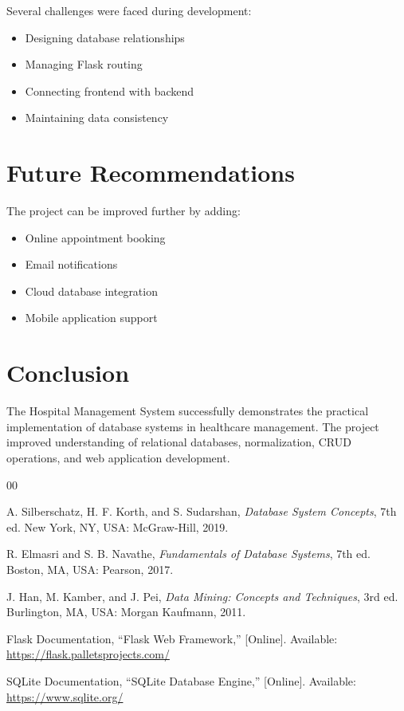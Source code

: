 \documentclass[conference]{IEEEtran}
\begin{document}
Several challenges were faced during development:

\begin{itemize}
    \item Designing database relationships
    \item Managing Flask routing
    \item Connecting frontend with backend
    \item Maintaining data consistency
\end{itemize}

\section{Future Recommendations}

The project can be improved further by adding:

\begin{itemize}
    \item Online appointment booking
    \item Email notifications
    \item Cloud database integration
    \item Mobile application support
\end{itemize}

\section{Conclusion}

The Hospital Management System successfully demonstrates the practical implementation of database systems in healthcare management. The project improved understanding of relational databases, normalization, CRUD operations, and web application development.

\begin{thebibliography}{00}

 A. Silberschatz, H. F. Korth, and S. Sudarshan, \textit{Database System Concepts}, 7th ed. New York, NY, USA: McGraw-Hill, 2019.

 R. Elmasri and S. B. Navathe, \textit{Fundamentals of Database Systems}, 7th ed. Boston, MA, USA: Pearson, 2017.

 J. Han, M. Kamber, and J. Pei, \textit{Data Mining: Concepts and Techniques}, 3rd ed. Burlington, MA, USA: Morgan Kaufmann, 2011.

 Flask Documentation, ``Flask Web Framework,'' [Online]. Available: \url{https://flask.palletsprojects.com/}

 SQLite Documentation, ``SQLite Database Engine,'' [Online]. Available: \url{https://www.sqlite.org/}

\end{thebibliography}
\end{document}
